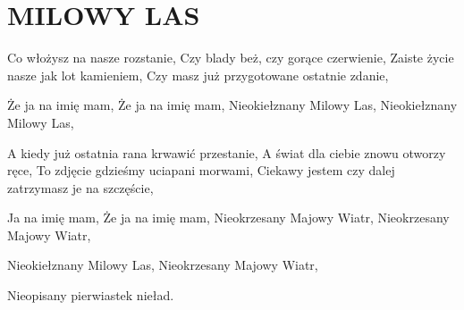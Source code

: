 \documentclass[../../../songbook.tex]{subfiles}
\begin{document}
\TabPositions{8cm} %
\section*{MILOWY LAS}
{}
\vspace{0.5cm}
Co włożysz na nasze rozstanie,			  \newline
Czy blady beż, czy gorące czerwienie,		 \newline
Zaiste życie nasze jak lot kamieniem,		 \newline
Czy masz już przygotowane ostatnie zdanie,		 \newline

\-\hspace{1cm} Że ja na imię mam,				 \newline
\-\hspace{1cm} Że ja na imię mam,			 \newline	
\-\hspace{1cm} Nieokiełznany Milowy Las,			 \newline
\-\hspace{1cm} Nieokiełznany Milowy Las,			 \newline

A kiedy już ostatnia rana krwawić przestanie,		 \newline
A świat dla ciebie znowu otworzy ręce,		 \newline
To zdjęcie gdzieśmy uciapani morwami,		 \newline
Ciekawy jestem czy dalej zatrzymasz je na szczęście,		 \newline

\-\hspace{1cm} Ja na imię mam,		 \newline
\-\hspace{1cm} Że ja na imię mam,		 \newline
\-\hspace{1cm} Nieokrzesany Majowy Wiatr,		 \newline
\-\hspace{1cm} Nieokrzesany Majowy Wiatr,		 \newline

Nieokiełznany Milowy Las,		 \newline
Nieokrzesany Majowy Wiatr,		 \newline

Nieopisany pierwiastek nieład.		 \newline
\end{document}
